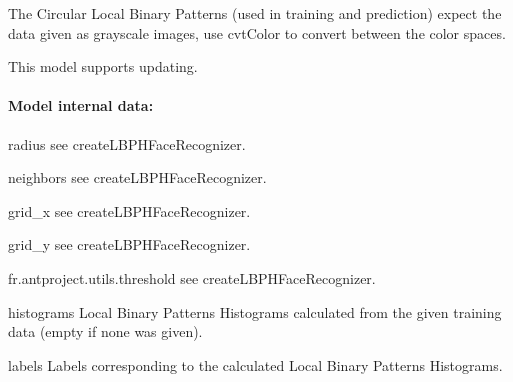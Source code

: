 \begin{DoxyItemize}
\item The Circular Local Binary Patterns (used in training and prediction) expect the data given as grayscale images, use cvt\+Color to convert between the color spaces.
\item This model supports updating. 
\end{DoxyItemize}

\paragraph*{Model internal data\+:}


\begin{DoxyItemize}
\item radius see create\+L\+B\+P\+H\+Face\+Recognizer.
\item neighbors see create\+L\+B\+P\+H\+Face\+Recognizer.
\item grid\+\_\+x see create\+L\+B\+P\+H\+Face\+Recognizer.
\item grid\+\_\+y see create\+L\+B\+P\+H\+Face\+Recognizer.
\item fr.antproject.utils.threshold see create\+L\+B\+P\+H\+Face\+Recognizer.
\item histograms Local Binary Patterns Histograms calculated from the given training data (empty if none was given).
\item labels Labels corresponding to the calculated Local Binary Patterns Histograms. 
\end{DoxyItemize}